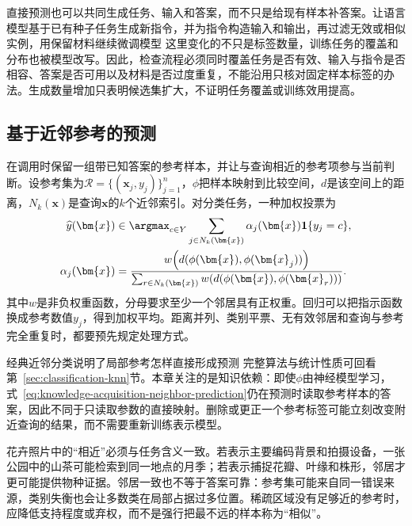 直接预测也可以共同生成任务、输入和答案，而不只是给现有样本补答案。让语言模型基于已有种子任务生成新指令，并为指令构造输入和输出，再过滤无效或相似实例，用保留材料继续微调模型
这里变化的不只是标签数量，训练任务的覆盖和分布也被模型改写。因此，检查流程必须同时覆盖任务是否有效、输入与指令是否相容、答案是否可用以及材料是否过度重复，不能沿用只核对固定样本标签的办法。生成数量增加只表明候选集扩大，不证明任务覆盖或训练效用提高。

\subsection{基于近邻参考的预测}
\label{sec:knowledge-acquisition-neighbor-prediction}

在调用时保留一组带已知答案的参考样本，并让与查询相近的参考项参与当前判断。设参考集为$\mathcal{R}=\{(\bm{x}_j,y_j)\}_{j=1}^{n}$，$\phi$把样本映射到比较空间，$d$是该空间上的距离，$N_k(\bm{x})$是查询$\bm{x}$的$k$个近邻索引。对分类任务，一种加权投票为
\begin{equation}
  \begin{aligned}
    \widehat{y}(\bm{x})
    &\in
    \argmax_{c\in Y}
    \sum_{j\in N_k(\bm{x})}
    \alpha_j(\bm{x})\mathbf{1}\{y_j=c\}, \\
    \alpha_j(\bm{x})
    &=
    \frac{w\!\left(d(\phi(\bm{x}),\phi(\bm{x}_j))\right)}
    {\sum_{r\in N_k(\bm{x})}w\!\left(d(\phi(\bm{x}),\phi(\bm{x}_r))\right)}.
  \end{aligned}
  \label{eq:knowledge-acquisition-neighbor-prediction}
\end{equation}
其中$w$是非负权重函数，分母要求至少一个邻居具有正权重。回归可以把指示函数换成参考数值$y_j$，得到加权平均。距离并列、类别平票、无有效邻居和查询与参考完全重复时，都要预先规定处理方式。

经典近邻分类说明了局部参考怎样直接形成预测
完整算法与统计性质可回看第~\ref{sec:classification-knn}节。本章关注的是知识依赖：即使$\phi$由神经模型学习，式~\eqref{eq:knowledge-acquisition-neighbor-prediction}仍在预测时读取参考样本的答案，因此不同于只读取参数的直接映射。删除或更正一个参考标签可能立刻改变附近查询的结果，而不需要重新训练表示模型。

花卉照片中的“相近”必须与任务含义一致。若表示主要编码背景和拍摄设备，一张公园中的山茶可能检索到同一地点的月季；若表示捕捉花瓣、叶缘和株形，邻居才更可能提供物种证据。邻居一致也不等于答案可靠：参考集可能来自同一错误来源，类别失衡也会让多数类在局部占据过多位置。稀疏区域没有足够近的参考时，应降低支持程度或弃权，而不是强行把最不远的样本称为“相似”。

